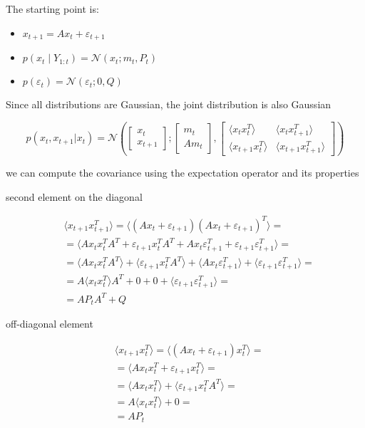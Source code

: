 \documentclass{article}
\newcommand{\E}[1]{\langle #1 \rangle} %
\newcommand{\norm}[3]{\mathcal{N}\left(#1; #2, #3\right)}
\begin{document}
The starting point is:
\begin{itemize}
    \item $x_{t+1} = Ax_{t} + \varepsilon_{t+1}$
    \item $p(x_t \mid Y_{1:t}) = \norm{x_t}{m_t}{P_t}$
    \item $p(\varepsilon_t) = \norm{\varepsilon_t}{0}{Q}$
\end{itemize}

Since all distributions are Gaussian, the joint distribution is also Gaussian

\begin{equation}\label{p_X_start}
p(x_t, x_{t+1}|x_t) = \norm{\begin{bmatrix}x_t\\x_{t+1}\end{bmatrix}}{\begin{bmatrix}m_t\\Am_t\end{bmatrix}}{\begin{bmatrix}\E{x_tx_t^T}&\E{x_tx_{t+1}^T}\\\E{x_{t+1}x_t^T}&\E{x_{t+1}x_{t+1}^T}\end{bmatrix}}
\end{equation}

we can compute the covariance using the expectation operator and its properties

second element on the diagonal

\begin{equation}\label{eq:cov_x_t1_x_t1}
\begin{split}
    &\E{x_{t+1} x_{t+1}^T} = \E{(Ax_t + \varepsilon_{t+1})(Ax_t + \varepsilon_{t+1})^T} =\\ &=\E{Ax_tx_t^TA^T + \varepsilon_{t+1}x_t^TA^T + Ax_t\varepsilon_{t+1}^T + \varepsilon_{t+1}\varepsilon_{t+1}^T} =\\&=\E{Ax_tx_t^TA^T} + \E{\varepsilon_{t+1}x_t^TA^T} + \E{Ax_t\varepsilon_{t+1}^T} + \E{\varepsilon_{t+1}\varepsilon_{t+1}^T} =\\
    &=A\E{x_tx_t^T}A^T + 0 + 0 + \E{\varepsilon_{t+1}\varepsilon_{t+1}^T} = \\
    &=AP_tA^T + Q
\end{split}
\end{equation}

off-diagonal element

\begin{equation}\label{eq:cov_x_t1_x_t}
\begin{split}
    &\E{x_{t+1} x_{t}^T} = \E{(Ax_t + \varepsilon_{t+1})x_t^T} =\\ &=\E{Ax_tx_t^T + \varepsilon_{t+1}x_t^T} =\\&=\E{Ax_tx_t^T} + \E{\varepsilon_{t+1}x_t^TA^T} =\\
    &=A\E{x_tx_t^T} + 0 = \\
    &=AP_t
\end{split}
\end{equation}
\end{document}
